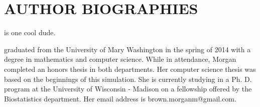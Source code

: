 \section*{AUTHOR BIOGRAPHIES}

 is one cool dude.

 graduated from the University of Mary Washington in the spring of 2014 with a degree in mathematics and computer science. While in attendance, Morgan completed an honors thesis in both departments. Her computer science thesis was based on the beginnings of this simulation. She is currently studying in a Ph. D. program at the University of Wisconsin - Madison on a fellowship offered by the Biostatistics department. Her email address is brown.morganm@gmail.com.

